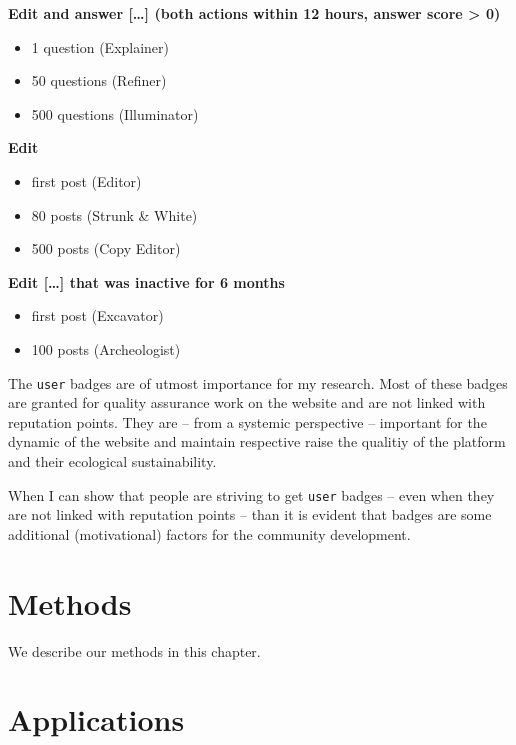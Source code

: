 \documentclass[]{book}
\providecommand{\tightlist}{%
  \setlength{\itemsep}{0pt}\setlength{\parskip}{0pt}}
\theoremstyle{definition}
\theoremstyle{definition}
\theoremstyle{definition}
\theoremstyle{remark}
\begin{document}
\textbf{Edit and answer {[}\ldots{}{]} (both actions within 12 hours,
answer score \textgreater{} 0)}

\begin{itemize}
\tightlist
\item
  1 question (Explainer)
\item
  50 questions (Refiner)
\item
  500 questions (Illuminator)
\end{itemize}

\textbf{Edit}

\begin{itemize}
\tightlist
\item
  first post (Editor)
\item
  80 posts (Strunk \& White)
\item
  500 posts (Copy Editor)
\end{itemize}

\textbf{Edit {[}\ldots{}{]} that was inactive for 6 months}

\begin{itemize}
\tightlist
\item
  first post (Excavator)
\item
  100 posts (Archeologist)
\end{itemize}

The \texttt{user} badges are of utmost importance for my research. Most
of these badges are granted for quality assurance work on the website
and are not linked with reputation points. They are -- from a systemic
perspective -- important for the dynamic of the website and maintain
respective raise the qualitiy of the platform and their ecological
sustainability.

When I can show that people are striving to get \texttt{user} badges --
even when they are not linked with reputation points -- than it is
evident that badges are some additional (motivational) factors for the
community development.

\chapter{Methods}\label{methods}

We describe our methods in this chapter.

\chapter{Applications}\label{applications}
\end{document}

